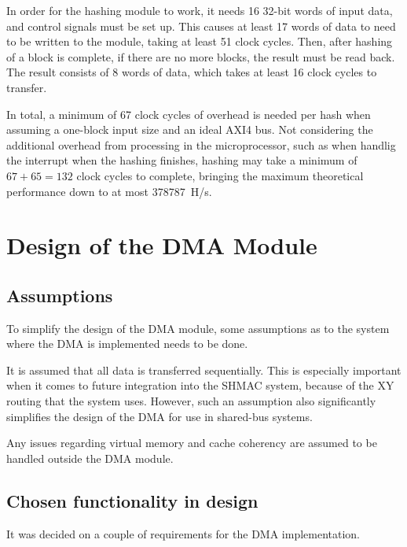 In order for the hashing module to work, it needs 16 32-bit words of input data,
and control signals must be set up. This causes at least 17 words of data to
need to be written to the module, taking at least 51 clock cycles. Then, after
hashing of a block is complete, if there are no more blocks, the result must
be read back. The result consists of 8 words of data, which takes at least 16
clock cycles to transfer.

In total, a minimum of 67 clock cycles of overhead is needed per hash when assuming
a one-block input size and an ideal AXI4 bus. Not considering the additional overhead
from processing in the microprocessor, such as when handlig the interrupt when the
hashing finishes, hashing may take a minimum of $67 + 65 = 132$ clock cycles to
complete, bringing the maximum theoretical performance down to at most 378787~H/s.

\section{Design of the DMA Module}
\label{sec:dma-architecture}

\subsection{Assumptions}
To simplify the design of the DMA module, some assumptions as to the system where the
DMA is implemented needs to be done.

It is assumed that all data is transferred sequentially. 
This is especially important when it comes to future integration into the SHMAC system, because of the XY routing that the system uses.
However, such an assumption also significantly simplifies the design of the DMA for use in shared-bus systems.

Any issues regarding virtual memory and cache coherency are assumed to be handled outside the DMA module.

\subsection{Chosen functionality in design}

It was decided on a couple of requirements for the DMA implementation.

